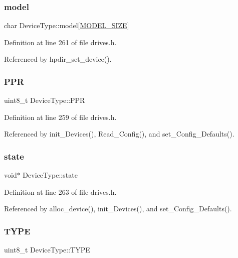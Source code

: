 \subsubsection{\texorpdfstring{model}{model}}
{\footnotesize\ttfamily char Device\+Type\+::model\mbox{[}\hyperlink{drives__sup_8h_a3f11d81c1e6d925611a9bdd5115064a0}{M\+O\+D\+E\+L\+\_\+\+S\+I\+ZE}\mbox{]}}



Definition at line 261 of file drives.\+h.



Referenced by hpdir\+\_\+set\+\_\+device().

\mbox{\label{structDeviceType_ae0e59c6c17582ff80bdab3f2010e8d57}} 
\subsubsection{\texorpdfstring{P\+PR}{PPR}}
{\footnotesize\ttfamily uint8\+\_\+t Device\+Type\+::\+P\+PR}



Definition at line 259 of file drives.\+h.



Referenced by init\+\_\+\+Devices(), Read\+\_\+\+Config(), and set\+\_\+\+Config\+\_\+\+Defaults().

\mbox{\label{structDeviceType_ad0fc43d63606bab6c259047e36512e08}} 
\subsubsection{\texorpdfstring{state}{state}}
{\footnotesize\ttfamily void$\ast$ Device\+Type\+::state}



Definition at line 263 of file drives.\+h.



Referenced by alloc\+\_\+device(), init\+\_\+\+Devices(), and set\+\_\+\+Config\+\_\+\+Defaults().

\mbox{\label{structDeviceType_acee5219162b6f47a9423b2086d127ede}} 
\subsubsection{\texorpdfstring{T\+Y\+PE}{TYPE}}
{\footnotesize\ttfamily uint8\+\_\+t Device\+Type\+::\+T\+Y\+PE}



